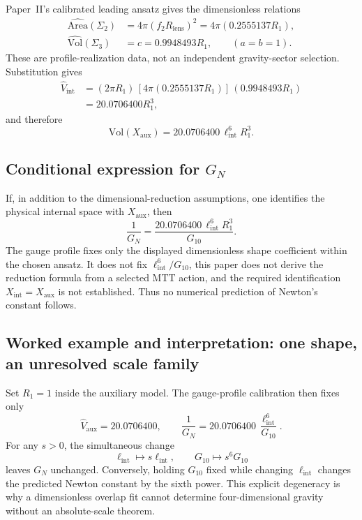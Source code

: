 \documentclass[11pt]{article}
\begin{document}
Paper~II's calibrated leading ansatz gives the dimensionless relations
\begin{align}
\widehat{\mathrm{Area}}(\Sigma_2)
&=4\pi(f_2R_{\mathrm{lens}})^2
=4\pi(0.2555137R_1),\\
\widehat{\mathrm{Vol}}(\Sigma_3)&=c=0.9948493R_1,
\qquad (a=b=1).
\end{align}
These are profile-realization data, not an independent gravity-sector
selection. Substitution gives
\begin{align}
\widehat V_{\mathrm{int}}
&=(2\pi R_1)\,[4\pi(0.2555137R_1)]\,(0.9948493R_1)\\
&=20.0706400R_1^3,
\end{align}
and therefore
\begin{equation}
\boxed{\mathrm{Vol}(X_{\mathrm{aux}})
=20.0706400\,\ell_{\mathrm{int}}^6R_1^3.}
\label{eq:volume_result}
\end{equation}

\subsection{Conditional expression for
\texorpdfstring{$G_N$}{Newton's constant}}

If, in addition to the dimensional-reduction assumptions, one identifies the
physical internal space with $X_{\mathrm{aux}}$, then
\begin{equation}
\boxed{\frac{1}{G_N}
=\frac{20.0706400\,\ell_{\mathrm{int}}^6R_1^3}{G_{10}}.}
\label{eq:GN_theta}
\end{equation}
The gauge profile fixes only the displayed dimensionless shape coefficient
within the chosen ansatz. It does not fix $\ell_{\mathrm{int}}^6/G_{10}$, this
paper does not derive the reduction formula from a selected MTT action, and the
required identification $X_{\mathrm{int}}=X_{\mathrm{aux}}$ is not established.
Thus no numerical prediction of Newton's constant follows.

\subsection{Worked example and interpretation: one shape, an unresolved scale family}

Set $R_1=1$ inside the auxiliary model. The gauge-profile calibration then
fixes only
\[
\widehat V_{\mathrm{aux}}=20.0706400,
\qquad
\frac{1}{G_N}
=20.0706400\,\frac{\ell_{\mathrm{int}}^6}{G_{10}}.
\]
For any $s>0$, the simultaneous change
\[
\ell_{\mathrm{int}}\longmapsto s\ell_{\mathrm{int}},
\qquad
G_{10}\longmapsto s^6G_{10}
\]
leaves $G_N$ unchanged. Conversely, holding $G_{10}$ fixed while changing
$\ell_{\mathrm{int}}$ changes the predicted Newton constant by the sixth
power. This explicit degeneracy is why a dimensionless overlap fit cannot
determine four-dimensional gravity without an absolute-scale theorem.
\end{document}
